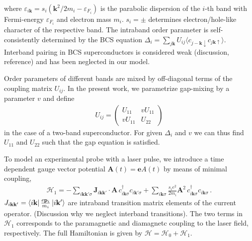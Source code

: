 \documentclass[aps,prb,reprint,noeprint,superscriptaddress]{revtex4-1}
\begin{document}
where $\varepsilon_{i\mathbf{k}} = s_i \left(\mathbf{k}^2/2m_i -
\varepsilon_{F_i}\right)$ is the parabolic dispersion of the $i$-th band with
Fermi-energy $\varepsilon_{F_i}$ and electron mass $m_i$. 
$s_i=\pm$ determines electron/hole-like character of the respective band. The intraband 
order parameter is self-consistently determined by the BCS equation
$\Delta_i = \sum_{j\mathbf{k}}^{}U_{ij} \langle c_{j-\mathbf{k}\downarrow
}c_{j\mathbf{k}\uparrow }\rangle$. Interband pairing in BCS superconductors is
considered weak (discussion, reference) and has been neglected in our model. 

Order parameters of different bands are mixed by off-diagonal terms of the
coupling matrix $U_{ij}$. In the present work, we parametrize
gap-mixing by a parameter $v$ and define
\begin{eqnarray*}
  U_{ij} = 
  \begin{pmatrix}
    U_{11} & v U_{11} \\
    v U_{11} & U_{22}
  \end{pmatrix}
\end{eqnarray*}
in the case of a two-band superconductor.
For given $\Delta_i$ and $v$ we can thus find $U_{11}$ and
$U_{22}$ such that the gap equation is satisfied.

To model an experimental probe with a laser pulse, we introduce a time dependent gauge vector
potential $\mathbf{A}(t)=\mathbf{e} A(t)$ by means of minimal coupling,
\begin{eqnarray*}
	\mathcal{H}_{1} = -\sum_{i\mathbf{kk'}\sigma}^{}
	\mathbf{J}_{i\mathbf{kk'}} \cdot \mathbf{A} \,
	c_{i\mathbf{k}\sigma}^\dagger  c_{i\mathbf{k}'\sigma} +
	\sum_{i\mathbf{k}\sigma}^{} \frac{s_i e^2}{2m_i} \mathbf{A}^2 \,
	c_{i\mathbf{k}\sigma}^\dagger c_{i\mathbf{k}\sigma}\,.
\end{eqnarray*}
$J_{i\mathbf{kk'}}=\bra{i\mathbf{k}}\frac{e\mathbf{p}_i}{m_i}
\ket{i\mathbf{k'}}$ are intraband transition matrix elements of the current
operator. (Discussion why we neglect interband transitions). The two terms in
$\mathcal{H}_1$ corresponds to the paramagnetic and diamagnetc coupling to the laser field,
respectively.
The full Hamiltonian is given by $\mathcal{H} = \mathcal{H}_{0} + \mathcal{H}_{1}$.
\end{document}
